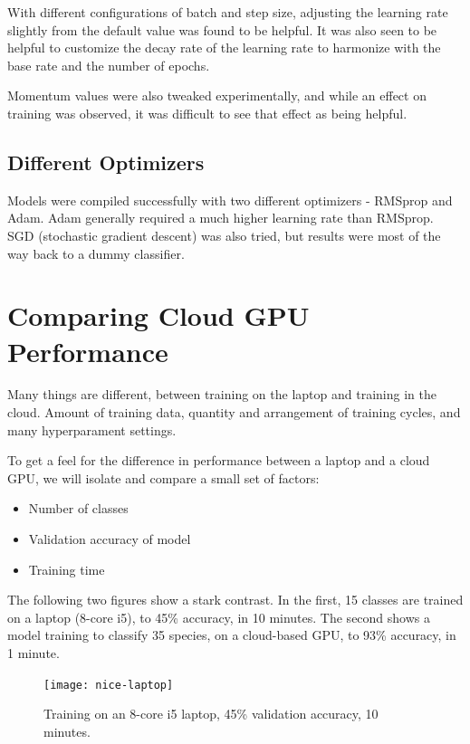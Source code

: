 \documentclass[sigconf]{acmart}
\begin{document}
With different configurations of batch and step size, adjusting the learning rate
slightly from the default value was found to be helpful. It was also seen to be helpful
to customize the decay rate of the learning rate to harmonize with the base rate and 
the number of epochs.

Momentum values were also tweaked experimentally, and while an effect on 
training was observed, it was difficult to see that effect as being helpful.

\subsection{Different Optimizers}
Models were compiled successfully with two different optimizers - RMSprop and Adam.
Adam generally required a much higher learning rate than RMSprop. SGD (stochastic gradient
descent) was also tried, but results were most of the way back to a dummy classifier.

\section{Comparing Cloud GPU Performance}

Many things are different, between training on the laptop and training in the cloud.
Amount of training data, quantity and arrangement of training cycles, and many
hyperparament settings.


To get a feel for the difference in performance between a laptop and a cloud GPU,
we will isolate and compare a small set of factors:

\begin{itemize}
\item Number of classes
\item Validation accuracy of model
\item Training time
\end{itemize}

The following two figures show a stark contrast. In the first, 15 classes are trained
on a laptop (8-core i5), to 45\% accuracy, in 10 minutes. The second shows a model training to
classify 35 species, on a cloud-based GPU, to 93\% accuracy, in 1 minute. 

\begin{figure}[h]
  \centering
  \texttt{[image: nice-laptop]}
  \caption{Training on an 8-core i5 laptop, 45\% validation accuracy, 10 minutes.}
\end{figure}
\end{document}
